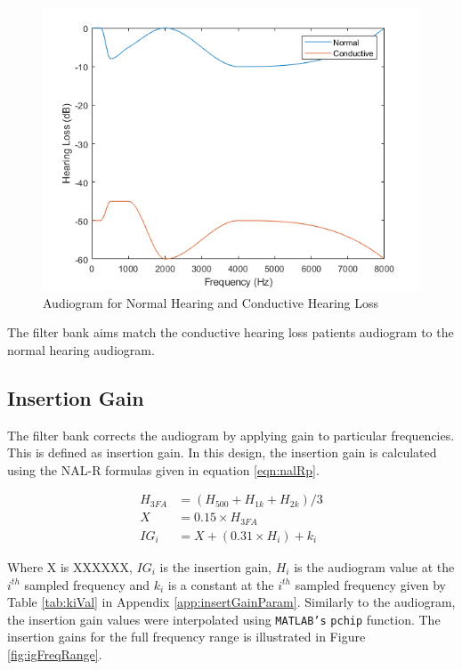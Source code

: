 \documentclass[12pt, onecolumn]{article}
\begin{document}
\begin{figure}[h]
\centering
\includegraphics[width=0.6\linewidth]{normCondAudiogram.PNG}
\caption{Audiogram for Normal Hearing and Conductive Hearing Loss}
\label{fig:normCondAudio}
\end{figure}  

\noindent The filter bank aims match the conductive hearing loss patients audiogram to the normal hearing audiogram.

\subsection{Insertion Gain}
\label{sec:insertGain}

\noindent The filter bank corrects the audiogram by applying gain to particular frequencies. This is defined as insertion gain. In this design, the insertion gain is calculated using the NAL-R formulas given in equation \ref{eqn:nalRp}.

\begin{equation}
\label{eqn:nalRp}
\begin{aligned}
H_{3FA} &= (H_{500} + H_{1k} + H_{2k})/3 \\
X &= 0.15 \times H_{3FA} \\ 
IG_i &= X + (0.31\times H_i) + k_i
\end{aligned}
\end{equation}

\noindent Where X is XXXXXX, $IG_i$ is the insertion gain, $H_i$ is the audiogram value at the $i^{th}$ sampled frequency and $k_i$ is a constant at the $i^{th}$ sampled frequency given by Table \ref{tab:kiVal} in Appendix \ref{app:insertGainParam}. Similarly to the audiogram, the insertion gain values were interpolated using \texttt{MATLAB's} \texttt{pchip} function. The insertion gains for the full frequency range is illustrated in Figure \ref{fig:igFreqRange}.
\end{document}
